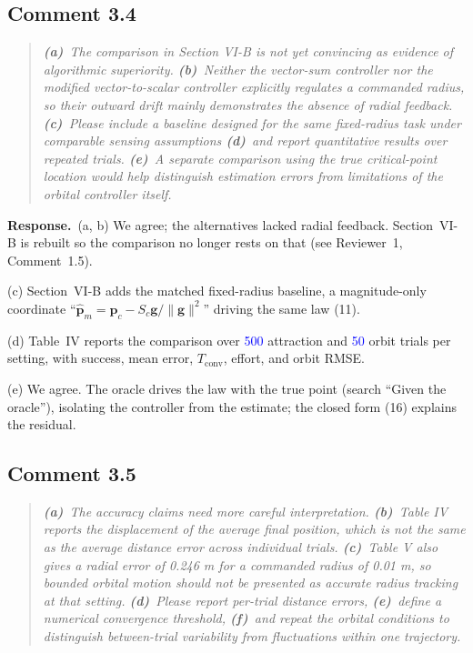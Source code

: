 \documentclass[10pt]{article}
\newcommand{\newnum}[1]{\textcolor{blue}{#1}}        %
\newcommand{\resp}{\par\textbf{Response.}~}
\begin{document}
\subsection*{Comment 3.4}

\begin{quote}\itshape
\textbf{(a)}~The comparison in Section VI-B is not yet convincing as evidence of algorithmic superiority.
\textbf{(b)}~Neither the vector-sum controller nor the modified vector-to-scalar controller explicitly regulates a commanded radius, so their outward drift mainly demonstrates the absence of radial feedback.
\textbf{(c)}~Please include a baseline designed for the same fixed-radius task under comparable sensing assumptions
\textbf{(d)}~and report quantitative results over repeated trials.
\textbf{(e)}~A separate comparison using the true critical-point location would help distinguish estimation errors from limitations of the orbital controller itself.
\end{quote}

\resp (a, b) We agree; the alternatives lacked radial feedback. Section~VI-B is rebuilt so the comparison no longer rests on that (see Reviewer~1, Comment~1.5).

(c) Section~VI-B adds the matched fixed-radius baseline, a magnitude-only coordinate ``$\hat{\mathbf{p}}_m = \mathbf{p}_c - S_c\mathbf{g}/\|\mathbf{g}\|^2$'' driving the same law (11).

(d) Table~IV reports the comparison over \newnum{500} attraction and \newnum{50} orbit trials per setting, with success, mean error, $T_{\mathrm{conv}}$, effort, and orbit RMSE.

(e) We agree. The oracle drives the law with the true point (search ``Given the oracle''), isolating the controller from the estimate; the closed form (16) explains the residual.

\subsection*{Comment 3.5}

\begin{quote}\itshape
\textbf{(a)}~The accuracy claims need more careful interpretation.
\textbf{(b)}~Table IV reports the displacement of the average final position, which is not the same as the average distance error across individual trials.
\textbf{(c)}~Table V also gives a radial error of 0.246 m for a commanded radius of 0.01 m, so bounded orbital motion should not be presented as accurate radius tracking at that setting.
\textbf{(d)}~Please report per-trial distance errors,
\textbf{(e)}~define a numerical convergence threshold,
\textbf{(f)}~and repeat the orbital conditions to distinguish between-trial variability from fluctuations within one trajectory.
\end{quote}
\end{document}
